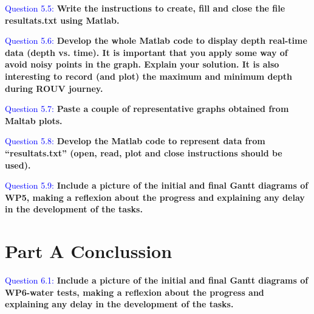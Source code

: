 \documentclass[12pt, a4papre]{article}
\begin{document}
	
		
	
	\textcolor{blue}{Question 5.5:} \textbf{Write the instructions to create, fill and close the file resultats.txt using Matlab.}
		
	
	
	\textcolor{blue}{Question 5.6:} \textbf{Develop the whole Matlab code to display depth real-time data (depth vs. time). It is important that you apply some way of avoid noisy points in the graph. Explain your solution. It is also interesting to record (and plot) the maximum and minimum depth during ROUV journey.}
	
	
	
	\textcolor{blue}{Question 5.7:} \textbf{Paste a couple of representative graphs obtained from Maltab plots.}
	
	\textcolor{blue}{Question 5.8:} \textbf{Develop the Matlab code to represent data from “resultats.txt” (open, read, plot and close instructions should be used).}
	
	
	
	\textcolor{blue}{Question 5.9:} \textbf{Include a picture of the initial and final Gantt diagrams of WP5, making a reflexion about the progress and explaining any delay in the development of the tasks.}
	
	
	\section{Part A Conclussion}
	
	\textcolor{blue}{Question 6.1:} \textbf{Include a picture of the initial and final Gantt diagrams of WP6-water tests, making a reflexion about the progress and explaining any delay in the development of the tasks.}
	
	
	

	
\end{document}
